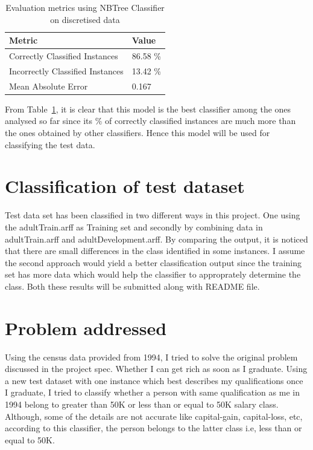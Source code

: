 \documentclass[11pt]{article}
\begin{document}
\begin{table}[h]
 \begin{center}
\begin{tabular}{|l|l|}

	\hline
     Metric & Value  \\
     \hline\hline
     Correctly Classified Instances & 86.58 \% \\
	 Incorrectly Classified Instances & 13.42 \% \\
	 Mean Absolute Error& 0.167 \\
     \hline
     
 \end{tabular}
\caption{Evaluation metrics using NBTree Classifier on discretised data}\label{table-6}
 \end{center}
\end{table}

From Table~\ref{table-6}, it is clear that this model is the best classifier among the ones analysed so far since its \% of correctly classified instances are much more than the ones obtained by other classifiers. Hence this model will be used for classifying the test data. 

\section{Classification of test dataset}
Test data set has been classified in two different ways in this project. One using the adultTrain.arff as Training set and secondly by combining data in adultTrain.arff and adultDevelopment.arff. By comparing the output, it is noticed that there are small differences in the class identified in some instances. I assume the second approach would yield a better classification output since the training set has more data which would help the classifier to approprately determine the class. Both these results will be submitted along with README file.

\section{Problem addressed}
Using the census data provided from 1994, I tried to solve the original problem discussed in the project spec. Whether I can get rich as soon as I graduate. Using a new test dataset with one instance which best describes my qualifications once I graduate, I tried to classify whether a person with same qualification as me in 1994 belong to greater than 50K or less than or equal to 50K salary class. Although, some of the details are not accurate like capital-gain, capital-loss, etc, according to this classifier, the person belongs to the latter class i.e, less than or equal to 50K. 
\end{document}
